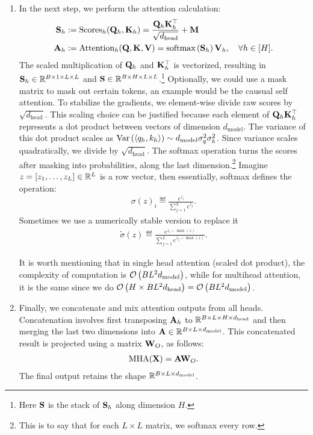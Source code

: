 \documentclass[11pt]{article}  %
\begin{document}
\begin{enumerate}
  \item In the next step, we perform the attention calculation:
  \begin{align*}
    \mathbf{S}_h &:= \text{Scores}_h(\mathbf{Q}_h, \mathbf{K}_h) = \frac{\mathbf{Q}_h \mathbf{K}_h^{\top}}{\sqrt{d_{\text{head}}}} + \mathbf{M}\\
    \mathbf{A}_h &:= \text{Attention}_h(\mathbf{Q}, \mathbf{K}, \mathbf{V}) = \text{softmax}\left( \mathbf{S}_h \right)\mathbf{V}_h, \quad \forall h \in [H].
  \end{align*}
  The scaled multiplication of $\mathbf{Q}_h$ and $\mathbf{K}^{\top}_h$ is vectorized, resulting in $\mathbf{S}_h \in \mathbb{R}^{B\times 1\times L \times L}$ and $\mathbf{S} \in \mathbb{R}^{B\times H\times L \times L}$.\footnote{Here $\mathbf{S}$ is the stack of $\mathbf{S}_h$ along dimension $H$.}
  Optionally, we could use a mask matrix to mask out certain tokens, an example would be the causual self attention.
  To stabilize the gradients, we element-wise divide raw scores by $\sqrt{d_{\text{head}}}$.
  This scaling choice can be justified because each element of $\mathbf{Q}_h\mathbf{K}_h^{\top}$ represents a dot product between vectors of dimension $d_{\text{model}}$. 
  The variance of this dot product scales as $\operatorname{Var}\left( \left\langle q_h, k_h \right\rangle \right)\sim d_{\text{model}}\sigma_q^2\sigma_k^2$. 
  Since variance scales quadratically, we divide by $\sqrt{d_{\text{head}}}$.
  The softmax operation turns the scores after masking into probabilities, along the last dimension.\footnote{This is to say that for each $L \times L$ matrix, we softmax every row.}
  Imagine $z = [z_1, \hdots, z_L] \in \mathbb{R}^L$ is a row vector, then essentially, softmax defines the operation:
  \begin{align}
    \sigma(z)_i \eqdef \frac{e^{z_i}}{\sum_{j=1}^{L}e^{z_j}}.
  \end{align}
  Sometimes we use a numerically stable version to replace it 
  \begin{align}
    \tilde{\sigma}(z) \eqdef \frac{e^{z_i - \max(z)}}{\sum_{j=1}^{L}e^{z_j - \max(z)}}.
  \end{align}

  It is worth mentioning that in single head attention (scaled dot product), the complexity of computation is $\mathcal{O}\left( BL^2d_{\text{model}} \right)$, while for multihead attention, it is the same since we do $\mathcal{O}\left( H \times BL^2d_{\text{head}} \right) = \mathcal{O}\left( BL^2d_{\text{model}} \right)$. 

  \item Finally, we concatenate and mix attention outputs from all heads. 
  Concatenation involves first transposing $\mathbf{A}_h$ to $\mathbb{R}^{B \times L \times H \times d_{\text{head}}}$ and then merging the last two dimensions into $\mathbf{A} \in \mathbb{R}^{B \times L \times d_{\text{model}}}$. 
  This concatenated result is projected using a matrix $\mathbf{W}_O$, as follows:
  \begin{align}
    \text{MHA}(\mathbf{X}) = \mathbf{A}\mathbf{W}_{O}. 
  \end{align}
  The final output retains the shape $\mathbb{R}^{B \times L \times d_{\text{model}}}$.
\end{enumerate}
\end{document}
